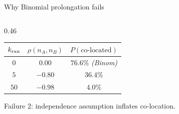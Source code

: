 \documentclass[10pt,aspectratio=169]{beamer}
\begin{document}
\begin{frame}{Why Binomial prolongation fails}
\begin{columns}[T]
\begin{column}{0.46\textwidth}
      \medskip
      \begin{center}
      \renewcommand{\arraystretch}{1.2}
      {\footnotesize
      \begin{tabular}{@{}ccc@{}}
        \toprule
        $k_{\rm rxn}$ & $\rho(n_A, n_B)$ & $P(\text{co-located})$ \\
        \midrule
        $0$ & $0.00$ & $76.6\%$ \emph{(Binom)} \\
        $5$ & $-0.80$ & $36.4\%$ \\
        $50$ & $-0.98$ & $\mathbf{4.0\%}$ \\
        \bottomrule
      \end{tabular}
      }
      \end{center}
      {\scriptsize Failure 2: independence assumption inflates co-location.}
    \end{column}
  \end{columns}

\end{frame}
\end{document}
